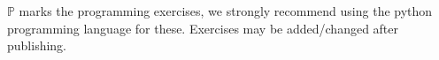 \(\mathbb{P}\) marks the programming exercises, we strongly recommend using
the python programming language for these. Exercises may be added/changed
after publishing.
